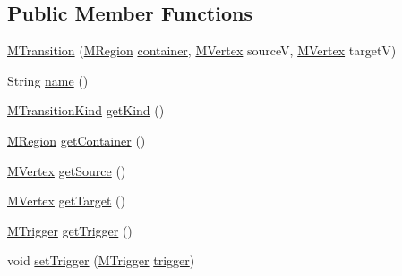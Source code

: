 \subsection*{Public Member Functions}
\begin{DoxyCompactItemize}
\item 
\hyperlink{classorg_1_1tzi_1_1use_1_1uml_1_1mm_1_1statemachines_1_1_m_transition_af74c89b39933ab2b1c8200527f74f412}{M\-Transition} (\hyperlink{classorg_1_1tzi_1_1use_1_1uml_1_1mm_1_1statemachines_1_1_m_region}{M\-Region} \hyperlink{classorg_1_1tzi_1_1use_1_1uml_1_1mm_1_1statemachines_1_1_m_transition_ace7d397d6075cffcdb50a7f8260b008e}{container}, \hyperlink{classorg_1_1tzi_1_1use_1_1uml_1_1mm_1_1statemachines_1_1_m_vertex}{M\-Vertex} source\-V, \hyperlink{classorg_1_1tzi_1_1use_1_1uml_1_1mm_1_1statemachines_1_1_m_vertex}{M\-Vertex} target\-V)
\item 
String \hyperlink{classorg_1_1tzi_1_1use_1_1uml_1_1mm_1_1statemachines_1_1_m_transition_a78ab6f44c2d332ac9d59c2d3070c5839}{name} ()
\item 
\hyperlink{enumorg_1_1tzi_1_1use_1_1uml_1_1mm_1_1statemachines_1_1_m_transition_kind}{M\-Transition\-Kind} \hyperlink{classorg_1_1tzi_1_1use_1_1uml_1_1mm_1_1statemachines_1_1_m_transition_a0f9233ead581f1b9ab774ce27752477b}{get\-Kind} ()
\item 
\hyperlink{classorg_1_1tzi_1_1use_1_1uml_1_1mm_1_1statemachines_1_1_m_region}{M\-Region} \hyperlink{classorg_1_1tzi_1_1use_1_1uml_1_1mm_1_1statemachines_1_1_m_transition_a6103c6f0567442317df5fc6724288ea8}{get\-Container} ()
\item 
\hyperlink{classorg_1_1tzi_1_1use_1_1uml_1_1mm_1_1statemachines_1_1_m_vertex}{M\-Vertex} \hyperlink{classorg_1_1tzi_1_1use_1_1uml_1_1mm_1_1statemachines_1_1_m_transition_a1c3e07e0059993272276c2df4873b6e3}{get\-Source} ()
\item 
\hyperlink{classorg_1_1tzi_1_1use_1_1uml_1_1mm_1_1statemachines_1_1_m_vertex}{M\-Vertex} \hyperlink{classorg_1_1tzi_1_1use_1_1uml_1_1mm_1_1statemachines_1_1_m_transition_a1b5cc6b4f91b0282741ac4530ec7ca1c}{get\-Target} ()
\item 
\hyperlink{classorg_1_1tzi_1_1use_1_1uml_1_1mm_1_1commonbehavior_1_1communications_1_1_m_trigger}{M\-Trigger} \hyperlink{classorg_1_1tzi_1_1use_1_1uml_1_1mm_1_1statemachines_1_1_m_transition_a63ad2080b1c02961cff0401a902ba047}{get\-Trigger} ()
\item 
void \hyperlink{classorg_1_1tzi_1_1use_1_1uml_1_1mm_1_1statemachines_1_1_m_transition_a2f58bbcc31176094e05cd5225815ef3f}{set\-Trigger} (\hyperlink{classorg_1_1tzi_1_1use_1_1uml_1_1mm_1_1commonbehavior_1_1communications_1_1_m_trigger}{M\-Trigger} \hyperlink{classorg_1_1tzi_1_1use_1_1uml_1_1mm_1_1statemachines_1_1_m_transition_a2e4465cf1b947d667b48842d9879cc2d}{trigger})

\end{DoxyCompactItemize}
